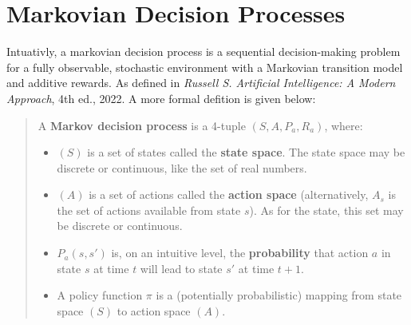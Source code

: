 \section{Markovian Decision Processes}

Intuativly, a markovian decision process is a sequential decision-making problem for a fully observable, stochastic environment with a Markovian transition model and additive rewards. As defined in \textit{Russell S. Artificial Intelligence: A Modern Approach}, 4th ed., 2022.
\newline
A more formal defition is given below:
\begin{quote}
A \textbf{Markov decision process} is a 4-tuple $(S, A, P_a, R_a)$, where:
\begin{itemize}
    \item $(S)$ is a set of states called the \textbf{state space}. The state space may be discrete or continuous, like the set of real numbers.
    \item $(A)$ is a set of actions called the \textbf{action space} (alternatively, $A_s$ is the set of actions available from state $s$). As for the state, this set may be discrete or continuous.
    \item $P_a(s, s')$ is, on an intuitive level, the \textbf{probability} that action $a$ in state $s$ at time $t$ will lead to state $s'$ at time $t+1$.
    \item A policy function $\pi$ is a (potentially probabilistic) mapping from state space $(S)$ to action space $(A)$.
\end{itemize}
\end{quote}

